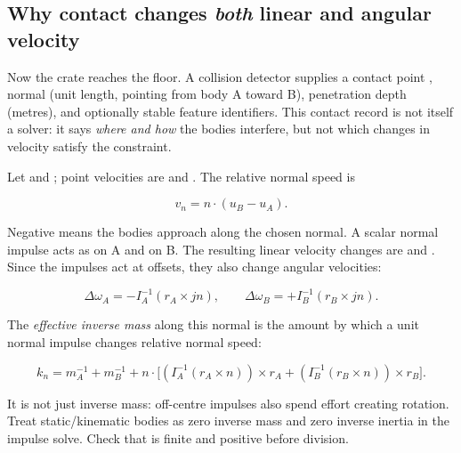 \subsection{\texorpdfstring{Why contact changes \emph{both} linear and angular velocity}{Why contact changes both linear and angular velocity}}\label{02-foundations-ii-ch039-why-contact-changes-both-linear-and-angular-velocity}

\hypertarget{02-foundations-ii-ch039-why-contact-changes-both-linear-and-angular-velocity}{}

Now the crate reaches the floor. A collision detector supplies a contact point , normal  (unit length, pointing from body A toward B), penetration depth  (metres), and optionally stable feature identifiers. This contact record is not itself a solver: it says \emph{where and how} the bodies interfere, but not which changes in velocity satisfy the constraint.

Let  and ; point velocities are  and . The relative normal speed is

\[
v_n=n\cdot(u_B-u_A).
\]

Negative  means the bodies approach along the chosen normal. A scalar normal impulse  acts as  on A and  on B. The resulting linear velocity changes are  and . Since the impulses act at offsets, they also change angular velocities:

\[
\Delta\omega_A=-I_A^{-1}(r_A\times jn),\qquad
\Delta\omega_B=+I_B^{-1}(r_B\times jn).
\]

The \emph{effective inverse mass} along this normal is the amount by which a unit normal impulse changes relative normal speed:

\[
k_n=m_A^{-1}+m_B^{-1}
+n\cdot\Big[
(I_A^{-1}(r_A\times n))\times r_A
+(I_B^{-1}(r_B\times n))\times r_B
\Big].
\]

It is not just inverse mass: off-centre impulses also spend effort creating rotation. Treat static/kinematic bodies as zero inverse mass and zero inverse inertia in the impulse solve. Check that  is finite and positive before division.


